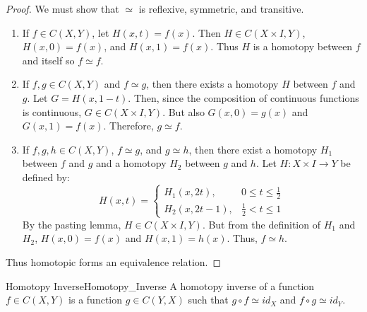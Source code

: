             \begin{proof}
                We must show that $\simeq$ is reflexive, symmetric, and
                transitive.
                \begin{enumerate}
                    \item If ${f}\in{C(X,Y)}$, let $H(x,t)=f(x)$. Then
                          $H\in{C({X}\times{I},Y)}$, $H(x,0)=f(x)$,
                          and $H(x,1)=f(x)$. Thus $H$ is a homotopy between
                          $f$ and itself so $f\simeq f$.
                    \item If ${f,g}\in{C(X,Y)}$ and ${f}\simeq{g}$, then there
                          exists a homotopy $H$ between $f$ and $g$. Let
                          $G=H(x,1-t)$. Then, since the composition of
                          continuous functions is continuous,
                          $G\in{C({X}\times{I},Y)}$. But also $G(x,0)=g(x)$ and
                          $G(x,1)=f(x)$. Therefore, ${g}\simeq{f}$.
                    \item If ${f,g,h}\in{C(X,Y)}$, ${f}\simeq{g}$, and
                          ${g}\simeq{h}$, then there exist a homotopy $H_{1}$
                          between $f$ and $g$ and a homotopy $H_{2}$ between
                          $g$ and $h$. Let $H:{X}\times{I}\rightarrow{Y}$
                          be defined by:
                          \begin{equation}
                              H(x,t)=
                              \begin{cases}
                                  H_{1}(x,2t),&{0}\leq{t}\leq\frac{1}{2}\\
                                  H_{2}(x,2t-1),&\frac{1}{2}<{t}\leq{1}
                              \end{cases}
                          \end{equation}
                          By the pasting lemma, $H\in{C({X}\times{I},Y)}$.
                          But from the definition of $H_{1}$ and $H_{2}$,
                          $H(x,0)=f(x)$ and $H(x,1)=h(x)$. Thus, $f\simeq{h}$.
                \end{enumerate}
                Thus homotopic forms an equivalence relation.
            \end{proof}
            \begin{ldefinition}{Homotopy Inverse}{Homotopy_Inverse}
                A homotopy inverse of a function $f\in{C}(X,Y)$ is a function
                $g\in{C}(Y,X)$ such that $g\circ{f}\simeq{id}_{X}$ and
                $f\circ{g}\simeq{id}_{Y}$.
            \end{ldefinition}
